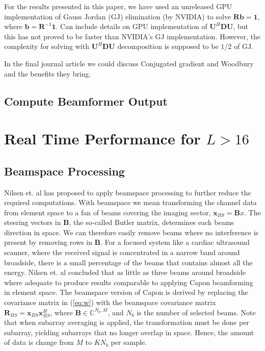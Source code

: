 \documentclass[journal]{IEEEtran}
\newcommand{\mat}[1]{\mathbf{#1}}
\renewcommand{\vec}[1]{\mathbf{#1}}
\begin{document}
For the results presented in this paper, we have used an unreleased GPU implementation of Gauss Jordan (GJ) elimination (by NVIDIA) to solve $\mat{R}\vec{b} = \vec{1}$, where $\vec{b} = \mat{R}^{-1}\vec{1}$. Can include details on GPU implementation of $\mat{U}^H\mat{D}\mat{U}$, but this has not proved to be faster than NVIDIA's GJ implementation. However, the complexity for solving with $\mat{U}^H\mat{D}\mat{U}$ decomposition is supposed to be $1/2$ of GJ.

In the final journal article we could discuss Conjugated gradient and Woodbury and the benefits they bring.

\subsection{Compute Beamformer Output}

\section{Real Time Performance for $L > 16$}\label{sec:meth2}

\subsection{Beamspace Processing}
Nilsen et. al \cite{Nilsen2009} has proposed to apply beamspace processing to further reduce the required computations. With beamspace we mean transforming the channel data from element space to a fan of beams covering the imaging sector, $\vec{x}_{BS} = \mat{B}x$.  The steering vectors in $\mat{B}$, the so-called Butler matrix, determines each beams direction in space. We can therefore easily remove beams where no interference is present by removing rows in $\mat{B}$. For a focused system like a cardiac ultrasound scanner, where the received signal is concentrated in a narrow band around broadside, there is a small percentage of the beams that contains almost all the energy. Nilsen et. al concluded that as little as three beams around broadside where adequate to produce results comparable to applying Capon beamforming in element space. The beamspace version of Capon is derived by replacing the covariance matrix in (\ref{eq:w}) with the beamspace covariance matrix $\mat{R}_{BS} = \vec{x}_{BS}\vec{x}_{BS}^H$, where $\mat{B} \in \mathbb{C}^{N_b,M}$, and $N_b$ is the number of selected beams. Note that when subarray averaging is applied, the transformation must be done per subarray, yielding subarrays that no longer overlap in space. Hence, the amount of data is change from $M$ to $KN_b$ per sample.
\end{document}
